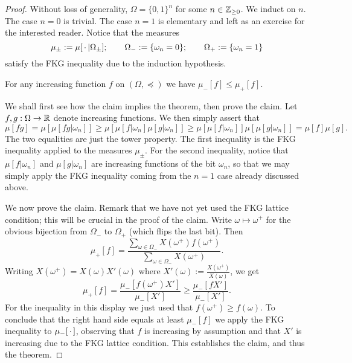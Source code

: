 \begin{proof}
    Without loss of generality, $\Omega=\{0,1\}^n$ for some $n\in\mathbb Z_{\geq 0}$.
    We induct on $n$.
    The case $n=0$ is trivial.
    The case $n=1$ is elementary and left as an exercise for the interested reader.
    Notice that the measures
    \[
        \mu_\pm:=\mu[\,\cdot\,|\Omega_\pm];
        \qquad
        \Omega_-:=\{\omega_n=0\};
        \qquad
        \Omega_+:=\{\omega_n=1\}
    \]
    satisfy the FKG inequality due to the induction hypothesis.

    \begin{claim*}
    For any increasing function $f$  on $(\Omega,\preceq)$ we have \(
            \mu_-[f]\leq\mu_+[f]
        \).
    \end{claim*}

    We shall first see how the claim implies the theorem,
    then prove the claim.
    Let $f,g:\Omega\to\mathbb R$ denote increasing functions.
    We then simply assert that
    \[
        \mu[fg] = \mu[\mu[fg|\omega_n]]
        \geq
        \mu[\mu[f|\omega_n]\mu[g|\omega_n]]
        \geq
        \mu[\mu[f|\omega_n]]\mu[\mu[g|\omega_n]]
        =
        \mu[f]\mu[g].
    \]
    The two equalities are just the tower property.
    The first inequality is the FKG inequality applied
    to the measures $\mu_\pm$.
    For the second inequality, notice that $\mu[f|\omega_n]$
    and $\mu[g|\omega_n]$ are increasing functions
    of the bit $\omega_n$,
    so that we may simply apply the FKG inequality
    coming from the $n=1$ case already discussed above.

    We now prove the claim.
    Remark that we have not yet used the FKG lattice condition;
    this will be crucial in the proof of the claim.
    Write $\omega\mapsto \omega^+$ for the obvious bijection
    from $\Omega_-$ to $\Omega_+$ (which flips the last bit).
    Then
    \[
        \mu_+[ f]
        =
        \frac{\sum_{\omega\in\Omega_-}X(\omega^+)f(\omega^+)}{\sum_{\omega\in\Omega_-}X(\omega^+)}.
    \]
    Writing $X(\omega^+)=X(\omega)X'(\omega)$
    where
    $X'(\omega):=\frac{X(\omega^+)}{X(\omega)}$,
    we get 
    \[
        \mu_+[ f]
        =
        \frac{\mu_-[ f(\omega^+) X']}{\mu_-[ X']}
        \geq
        \frac{\mu_-[ f X']}{\mu_-[ X']}
        .
    \]
    For the inequality in this display we just used that $f(\omega^+)\geq f(\omega)$.
    To conclude that the right hand side equals at least $\mu_-[ f]$
    we apply the FKG inequality to $\mu_-[\,\cdot\,]$,
    observing that $f$ is increasing by assumption and that $X'$ is increasing
    due to the FKG lattice condition.
    This establishes the claim, and thus the theorem.
\end{proof}

